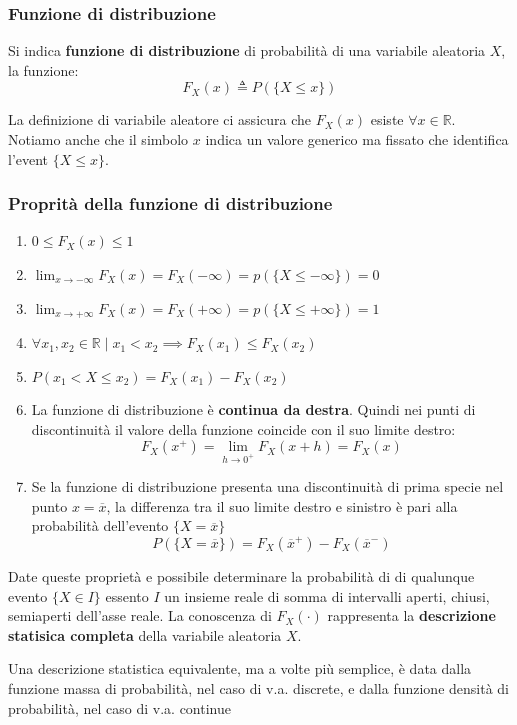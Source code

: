 \subsubsection{Funzione di distribuzione}\label{sec:Funzione di distribuzione} %
\begin{importantbox}
   Si indica \textbf{funzione di distribuzione} di probabilità di una variabile 
   aleatoria $X$, la funzione: 
   \[
       F_X(x) \triangleq P(\{X \leq  x\})
   \]
\end{importantbox}
La definizione di variabile aleatore ci assicura che $F_X(x)$ esiste $\forall x \in \mathbb R$. 
Notiamo anche che il simbolo $x$ indica un valore generico ma fissato che identifica
l'event $\{X \leq x\}$.
\subsubsection{Proprità della funzione di distribuzione}\label{sec:Proprità della funzione di distribuzione} %
\begin{enumerate}
    \item $ 0 \leq F_X(x) \leq 1$
    \item $\lim_{x \to -\infty} F_X(x) = F_X(-\infty) = p(\{X \leq -\infty\}) = 0 $
    \item $\lim_{x \to +\infty} F_X(x) = F_X(+\infty) = p(\{X \leq +\infty\}) = 1 $
    \item $\forall x_1,x_2 \in \mathbb R \mid x_1 < x_2 \implies F_X(x_1) \leq F_X(x_2)$ 
    \item $P(x_1 < X \leq x_2) = F_X(x_1) - F_X(x_2)$ 
    \item La funzione di distribuzione è \textbf{continua da destra}. Quindi nei punti di
    discontinuità il valore della funzione coincide con il suo limite destro: 
    \[
        F_X(x^+) = \lim_{h \to 0^+}F_X(x + h) = F_X(x)
    \]
    \item Se la funzione di distribuzione presenta una discontinuità di prima
    specie nel punto $x = \overline x$, la differenza tra il suo limite destro e sinistro
    è pari alla probabilità dell’evento $\{X = \overline x\}$
    \[
        P(\{X = \overline x\}) = F_X(\overline x^+) - F_X(\overline x^-)
    \]
\end{enumerate}
Date queste proprietà e possibile determinare la probabilità di di qualunque evento
$\{X \in I\}$ essento $I$ un insieme reale di somma di intervalli aperti, chiusi, semiaperti
dell'asse reale. La conoscenza di $F_X(\cdot)$ rappresenta la \textbf{descrizione statisica completa}
della variabile aleatoria $X$.
\begin{importantbox}
   Una descrizione statistica equivalente, ma a volte più semplice, è
    data dalla funzione massa di probabilità, nel caso di v.a. discrete, e
    dalla funzione densità di probabilità, nel caso di v.a. continue 
\end{importantbox}


